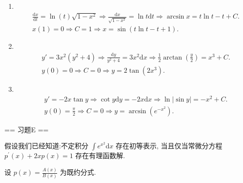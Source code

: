 \begin{solution}
\begin{enumerate}
    \item[6.]\\
    \[
    \begin{aligned}
    &\frac{\mathrm{d}x}{\mathrm{d}t}=\ln(t)\sqrt{1-x^2}\Rightarrow\frac{\mathrm{d}x}{\sqrt{1-x^2}}=\ln{t}\mathrm{d}t\Rightarrow \arcsin{x}=t\ln{t}-t+C.\\
    &x(1)=0\Rightarrow C=1\Rightarrow x=\sin(t\ln{t}-t+1).
    \end{aligned}
    \]

    \item[7.]\\
    \[
    \begin{aligned}
    &y'=3x^2(y^2+4)\Rightarrow\frac{\mathrm{d}y}{y^2+4}=3x^2\mathrm{d}x\Rightarrow \frac{1}{2}\arctan\left(\frac{y}{2}\right)=x^3+C.\\
    &y(0)=0\Rightarrow C=0\Rightarrow y=2\tan(2x^3).
    \end{aligned}
    \]

    \item[8.]\\
    \[
    \begin{aligned}
    &y'=-2x\tan{y}\Rightarrow \cot{y}\mathrm{d}y=-2x\mathrm{d}x\Rightarrow \ln\left|\sin{y}\right|=-x^2+C.\\
    &y(0)=\frac{\pi}{2}\Rightarrow C=0\Rightarrow y=\arcsin\left(e^{-x^2}\right).
    \end{aligned}
    \]
    \end{enumerate}
\end{solution}

== 习题E ==

假设我们已经知道:不定积分 $\displaystyle\int e^{x^{2}}\mathrm{d}x$ 存在初等表示,
当且仅当常微分方程 $\displaystyle p^{\prime}(x)+2x p(x) = 1$ 存在有理函数解.

设 $\displaystyle p(x) = \frac{A(x)}{B(x)}$ 为既约分式.

